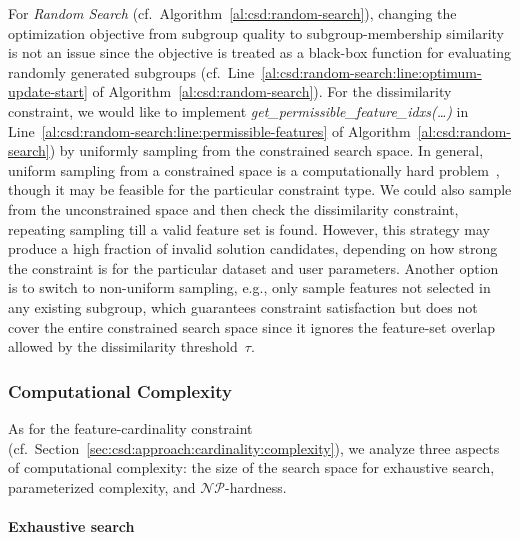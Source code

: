 \documentclass{article}
\theoremstyle{definition}
\begin{document}
For \emph{Random Search} (cf.~Algorithm~\ref{al:csd:random-search}), changing the optimization objective from subgroup quality to subgroup-membership similarity is not an issue since the objective is treated as a black-box function for evaluating randomly generated subgroups (cf.~Line~\ref{al:csd:random-search:line:optimum-update-start} of Algorithm~\ref{al:csd:random-search}).
For the dissimilarity constraint, we would like to implement \emph{get\_permissible\_feature\_idxs(\dots)} in Line~\ref{al:csd:random-search:line:permissible-features} of Algorithm~\ref{al:csd:random-search}) by uniformly sampling from the constrained search space.
In general, uniform sampling from a constrained space is a computationally hard problem~\cite{ermon2012uniform}, though it may be feasible for the particular constraint type.
We could also sample from the unconstrained space and then check the dissimilarity constraint, repeating sampling till a valid feature set is found.
However, this strategy may produce a high fraction of invalid solution candidates, depending on how strong the constraint is for the particular dataset and user parameters.
Another option is to switch to non-uniform sampling, e.g., only sample features not selected in any existing subgroup, which guarantees constraint satisfaction but does not cover the entire constrained search space since it ignores the feature-set overlap allowed by the dissimilarity threshold~$\tau$.

\subsubsection{Computational Complexity}
\label{sec:csd:approach:alternatives:complexity}

As for the feature-cardinality constraint (cf.~Section~\ref{sec:csd:approach:cardinality:complexity}), we analyze three aspects of computational complexity:
the size of the search space for exhaustive search, parameterized complexity, and $\mathcal{NP}$-hardness.

\paragraph{Exhaustive search}
\end{document}
